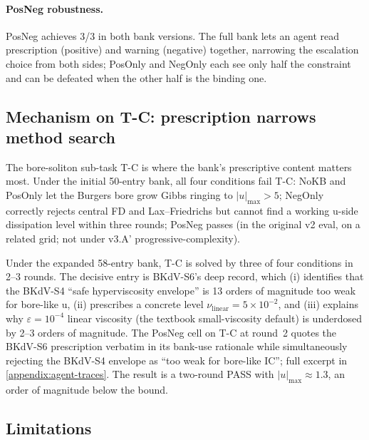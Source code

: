 \paragraph{PosNeg robustness.} PosNeg achieves 3/3 in both bank versions. The
full bank lets an agent read prescription (positive) and warning (negative)
together, narrowing the escalation choice from both sides; PosOnly and
NegOnly each see only half the constraint and can be defeated when the other
half is the binding one.

\subsection{Mechanism on T-C: prescription narrows method search}
\label{sec:tc-mechanism}

The bore-soliton sub-task T-C is where the bank's prescriptive content matters
most. Under the initial 50-entry bank, all four conditions fail T-C: NoKB and
PosOnly let the Burgers bore grow Gibbs ringing to $|u|_{\max} > 5$; NegOnly
correctly rejects central FD and Lax--Friedrichs but cannot find a working
u-side dissipation level within three rounds; PosNeg passes (in the original
v2 eval, on a related grid; not under v3.A' progressive-complexity).

Under the expanded 58-entry bank, T-C is solved by three of four conditions
in 2--3 rounds. The decisive entry is BKdV-S6's deep record, which (i)
identifies that the BKdV-S4 ``safe hyperviscosity envelope'' is 13 orders
of magnitude too weak for bore-like u, (ii) prescribes a concrete level
$\nu_\text{linear} = 5\times 10^{-2}$, and (iii) explains why $\varepsilon =
10^{-4}$ linear viscosity (the textbook small-viscosity default) is
underdosed by 2--3 orders of magnitude. The PosNeg cell on T-C at round~2
quotes the BKdV-S6 prescription verbatim in its bank-use rationale while
simultaneously rejecting the BKdV-S4 envelope as ``too weak for bore-like
IC''; full excerpt in \cref{appendix:agent-traces}. The result is a
two-round PASS with $|u|_{\max} \approx 1.3$, an order of magnitude below
the bound.

\subsection{Limitations}
\label{sec:case-study-limitations}

